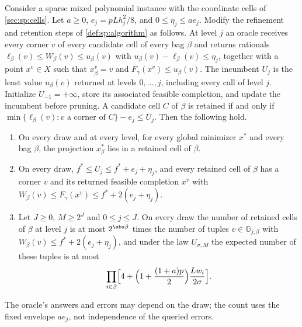 \begin{proposition}\label{prop:sp:conditional}
Consider a sparse mixed polynomial instance with the coordinate cells of
\cref{sec:sp:cells}. Let $a\ge0$, $e_j=pLh_j^2/8$, and
$0\le\eta_j\le a e_j$. Modify the refinement and retention steps
of \cref{def:sp:algorithm} as follows. At level $j$ an oracle receives every
corner $v$ of every candidate cell of every bag $\beta$ and returns rationals
$\ell_\beta(v)\le W_\beta(v)\le u_\beta(v)$ with
$u_\beta(v)-\ell_\beta(v)\le \eta_j$, together with a point $x^v\in X$ such
that $x^v_\beta=v$ and $F_\gamma(x^v)\le u_\beta(v)$. The incumbent $U_j$ is
the least value $u_\beta(v)$ returned at levels $0,\dots,j$, including every
call of level $j$. Initialize $U_{-1}=+\infty$, store its associated
feasible completion, and update the incumbent before pruning. A candidate
cell $C$ of $\beta$ is retained if and
only if $\min\{\ell_\beta(v):v\text{ a corner of }C\}-e_j\le U_j$. Then the
following hold.
\begin{enumerate}[label=(\alph*)]
\item On every draw and at every level, for every global minimizer $x^*$ and
every bag $\beta$, the projection $x^*_\beta$ lies in a retained cell of
$\beta$.
\item On every draw, $f^*\le U_j\le f^*+e_j+\eta_j$, and every retained cell of
$\beta$ has a corner $v$ and its returned feasible completion $x^v$ with
$W_\beta(v)\le F_\gamma(x^v)\le f^*+2(e_j+\eta_j)$.
\item Let $J\ge0$, $M\ge2^J$ and $0\le j\le J$. On every draw the number of
retained cells of $\beta$ at level $j$ is at most $2^{\abs\beta}$ times the
number of tuples $v\in\mathbb G_{j,\beta}$ with
$W_\beta(v)\le f^*+2(e_j+\eta_j)$, and under the law $U_{\sigma,M}$ the
expected number of these tuples is at most
\begin{equation}\label{eq:sp:conditional}
 \prod_{i\in\beta}\Bigl[4+\Bigl(1+\frac{(1+a)p}2\Bigr)\frac{Lw_i}{2\sigma}\Bigr].
\end{equation}
\end{enumerate}
The oracle's answers and errors may depend on the draw; the count uses
the fixed envelope $a e_j$, not independence of the queried errors.
\end{proposition}


